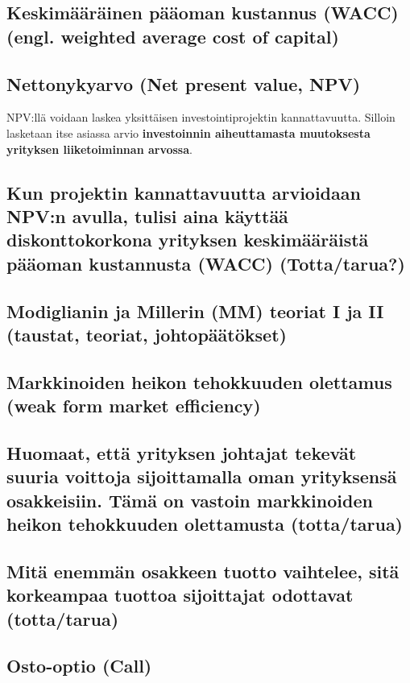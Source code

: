 \documentclass[a4paper]{article}
\begin{document}
\subsection{Keskimääräinen pääoman kustannus (WACC) (engl. weighted average cost of capital)}



\subsection{Nettonykyarvo (Net present value, NPV)}

NPV:llä voidaan laskea yksittäisen investointiprojektin kannattavuutta. Silloin lasketaan itse asiassa arvio \textbf{investoinnin aiheuttamasta muutoksesta yrityksen liiketoiminnan arvossa}. 

\subsection{Kun projektin kannattavuutta arvioidaan NPV:n avulla, tulisi aina käyttää diskonttokorkona yrityksen keskimääräistä pääoman kustannusta (WACC) (Totta/tarua?)}

\subsection{Modiglianin ja Millerin (MM) teoriat I ja II (taustat, teoriat, johtopäätökset)}

\subsection{Markkinoiden heikon tehokkuuden olettamus (weak form market efficiency)}

\subsection{Huomaat, että yrityksen johtajat tekevät suuria voittoja sijoittamalla oman yrityksensä osakkeisiin. Tämä on vastoin markkinoiden heikon tehokkuuden olettamusta (totta/tarua)}

\subsection{Mitä enemmän osakkeen tuotto vaihtelee, sitä korkeampaa tuottoa sijoittajat odottavat (totta/tarua)}

\subsection{Osto-optio (Call)}
\end{document}
